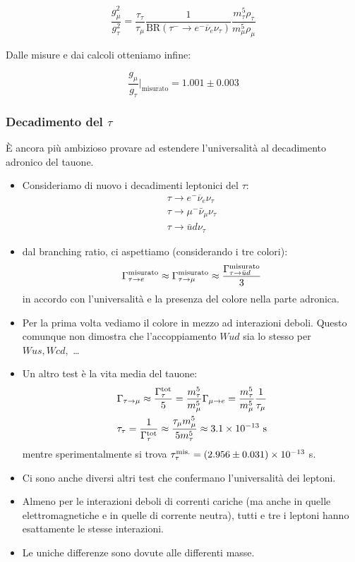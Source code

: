 \[
\frac{g_\mu^2}{g_\tau^2} =
\frac{\tau_\tau}{\tau_\mu}
\frac{1}{\text{BR}(\tau^- \to e^- \overline{\nu}_e \nu_\tau)}
\frac{m_\tau^5 \rho_\tau}{m_\mu^5 \rho_\mu}
\]

Dalle misure e dai calcoli otteniamo infine:

\[
\frac{g_\mu}{g_\tau} \Big|_\text{misurato} = 1.001 \pm 0.003
\]
\subsubsection{Decadimento del $\tau$}
È ancora più ambizioso provare ad estendere l'universalità al decadimento adronico del tauone.
\begin{itemize}
    \item Consideriamo di nuovo i decadimenti leptonici del $\tau$:
    \begin{gather*}
    \tau\to e^- \overline\nu_e \nu_\tau\\
    \tau\to \mu^- \bar\nu_\mu \nu_\tau\\
    \tau\to \bar ud\nu_\tau
    \end{gather*}
    \item dal branching ratio, ci aspettiamo (considerando i tre colori):
    \begin{equation*}
    \Gamma_{\tau\to e}^{\textnormal{misurato}}\approx \Gamma_{\tau\to\mu}^{\textnormal{misurato}}\approx \frac{\Gamma_{\tau\to \bar u d}^{\textnormal{misurato}}}{3}
    \end{equation*}
    in accordo con l'universalità e la presenza del colore nella parte adronica. 
    \item Per la prima volta vediamo il colore in mezzo ad interazioni deboli. Questo comunque non dimostra che l'accoppiamento $Wud$ sia lo stesso per $Wus, Wcd,$ \dots
    \item Un altro test è la vita media del tauone:
    \begin{gather*}
    \Gamma_{\tau\to\mu}\approx \frac{\Gamma_\tau^{\textnormal{tot}}}{5}=\frac{m_\tau^5}{m_\mu^5}\Gamma_{\mu\to e}=\frac{m_\tau^5}{m_\mu^5}\frac{1}{\tau_\mu}\\
    \tau_\tau=\frac{1}{\Gamma_\tau^{\textnormal{tot}}}\approx \frac{\tau_\mu m_\mu^5}{5m_\tau^5}\approx 3.1\times10^{-13}\textnormal{ s}
    \end{gather*}
    mentre sperimentalmente si trova $\tau_\tau^{\textnormal{mis.}}=(2.956\pm0.031)\times10^{-13}$ s.
    \item Ci sono anche diversi altri test che confermano l'universalità dei leptoni.
    \item Almeno per le interazioni deboli di correnti cariche (ma anche in quelle elettromagnetiche e in quelle di corrente neutra), tutti e tre i leptoni hanno esattamente le stesse interazioni.
    \item Le uniche differenze sono dovute alle differenti masse.
\end{itemize}
